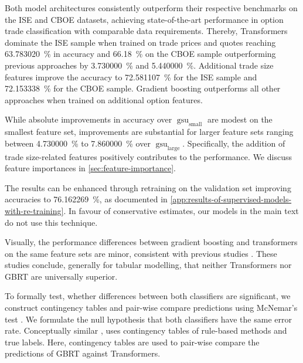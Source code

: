 Both model architectures consistently outperform their respective benchmarks on the \gls{ISE} and \gls{CBOE} datasets, achieving state-of-the-art performance in option trade classification with comparable data requirements. Thereby, Transformers dominate the \gls{ISE} sample when trained on trade prices and quotes reaching \SI{63.783020}{\percent}  in accuracy and \SI{66.18}{\percent} on the \gls{CBOE} sample outperforming previous approaches by \SI{3.730000}{\percent} and \SI{5.440000}{\percent}. Additional trade size features improve the accuracy to \SI{72.581107}{\percent} for the \gls{ISE} sample and \SI{72.153338}{\percent} for the \gls{CBOE} sample. Gradient boosting outperforms all other approaches when trained on additional option features.

While absolute improvements in accuracy over $\operatorname{gsu}_{\mathrm{small}}$ are modest on the smallest feature set, improvements are substantial for larger feature sets ranging between \SI{4.730000}{\percent} to \SI{7.860000}{\percent} over $\operatorname{gsu}_{\mathrm{large}}$. Specifically, the addition of trade size-related features positively contributes to the performance. We discuss feature importances in \cref{sec:feature-importance}.

The results can be enhanced through retraining on the validation set improving accuracies to \SI{76.162269}{\percent}, as documented in \cref{app:results-of-supervised-models-with-re-training}. In favour of conservative estimates, our models in the main text do not use this technique.

Visually, the performance differences between gradient boosting and transformers on the same feature sets are minor, consistent with previous studies \autocites{grinsztajnWhyTreebasedModels2022}{gorishniyRevisitingDeepLearning2021}. These studies conclude, generally for tabular modelling, that neither Transformers nor \gls{GBRT} are universally superior.

To formally test, whether differences between both classifiers are significant, we construct contingency tables and pair-wise compare predictions using McNemar's test \autocite[][153--157]{mcnemarNoteSamplingError1947}. We formulate the null hypothesis that both classifiers have the same error rate.
Conceptually similar \textcite[][267]{odders-whiteOccurrenceConsequencesInaccurate2000}, uses contingency tables of rule-based methods and true labels. Here, contingency tables are used to pair-wise compare the predictions of \gls{GBRT} against Transformers.

